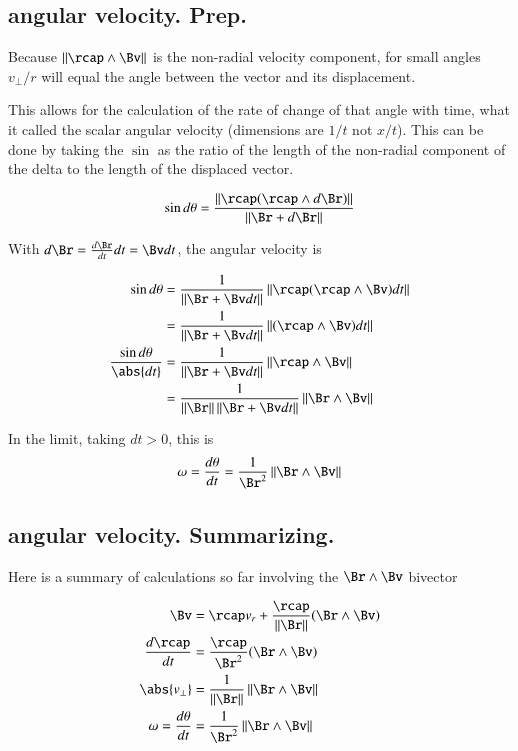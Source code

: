 \documentclass{article}
\newcommand{\dt}[1]{\frac{d {#1}}{dt}}
\newcommand{\Norm}[1]{\left\lVert{#1}\right\rVert}
\begin{document}
\subsection{angular velocity.  Prep.}

Because $\Norm{\rcap \wedge \Bv}$ is the non-radial velocity component, for small angles
${v_\perp}/r$ will equal the angle between the vector and its displacement.

This allows for the calculation of the rate of change of that angle with time, what it called the scalar
angular velocity (dimensions are $1/t$ not $x/t$).  This can be done by taking the $\sin$ as the ratio of the
length of the non-radial component of the delta to the length of the displaced vector.

\begin{align*}
\sin d\theta &= \frac{\Norm{\rcap(\rcap \wedge d\Br)}}{\Norm{\Br + d\Br}} \\
\end{align*}

With $d\Br = \dt{\Br} dt = \Bv dt$, the angular velocity is

\begin{align*}
\sin d\theta
   &= \frac{1}{\Norm{\Br + \Bv dt}} \Norm{ \rcap (\rcap \wedge \Bv) dt } \\
   &= \frac{1}{\Norm{\Br + \Bv dt}} \Norm{ (\rcap \wedge \Bv) dt } \\
\frac{\sin d\theta}{\abs{dt}}
   &= \frac{1}{\Norm{\Br + \Bv dt}} \Norm{ \rcap \wedge \Bv } \\
   &= \frac{1}{\Norm{\Br}\Norm{\Br + \Bv dt}} \Norm{ \Br \wedge \Bv } \\
\end{align*}

In the limit, taking $dt > 0$, this is
\[
\omega = \dt{\theta} = \frac{1}{\Br^2} \Norm{ \Br \wedge \Bv }
\]

\subsection{angular velocity.  Summarizing.}

Here is a summary of calculations so far involving the $\Br \wedge \Bv$ bivector

\begin{align*}
\Bv &= \rcap v_r + \frac{\rcap}{\Norm{\Br}} (\Br \wedge \Bv) \\
\dt{\rcap} &= \frac{\rcap}{\Br^2} (\Br \wedge \Bv) \\
\abs{v_{\perp}} &= \frac{1}{\Norm{\Br}} \Norm{ \Br \wedge \Bv } \\
\omega = \dt{\theta} &= \frac{1}{\Br^2} \Norm{ \Br \wedge \Bv } \\
\end{align*}
\end{document}
